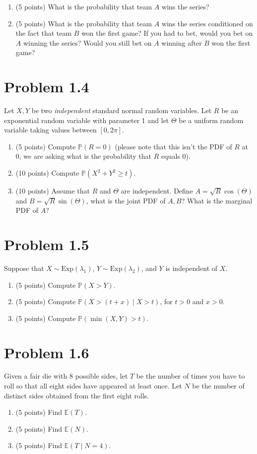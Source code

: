 \documentclass{article}
\begin{document}
\begin{enumerate}[label=(\alph*)]
    \item (5 points) What is the probability that team $A$ wins the series?
    \item (5 points) What is the probability that team $A$ wins the series conditioned on the fact that team $B$ won the first game? If you had to bet, would you bet on $A$ winning the series? Would you still bet on $A$ winning after $B$ won the first game?
\end{enumerate}

\section*{Problem 1.4}
Let $X, Y$ be two \textit{independent} standard normal random variables. Let $R$ be an exponential random variable with parameter 1 and let $\Theta$ be a uniform random variable taking values between $[0, 2\pi]$.

\begin{enumerate}[label=(\alph*)]
    \item (5 points) Compute $\mathbb{P}(R = 0)$ (please note that this isn’t the PDF of $R$ at 0, we are asking what is the probability that $R$ equals 0).
    \item (10 points) Compute $\mathbb{P}(X^2 + Y^2 \geq t)$.
    \item (10 points) Assume that $R$ and $\Theta$ are independent. Define $A = \sqrt{R}\cos(\Theta)$ and $B = \sqrt{R}\sin(\Theta)$, what is the joint PDF of $A, B$? What is the marginal PDF of $A$?
\end{enumerate}

\section*{Problem 1.5}
Suppose that $X \sim \text{Exp}(\lambda_1)$, $Y \sim \text{Exp}(\lambda_2)$, and $Y$ is independent of $X$.

\begin{enumerate}[label=(\alph*)]
    \item (5 points) Compute $\mathbb{P}(X > Y)$.
    \item (5 points) Compute $\mathbb{P}(X > (t + x) \mid X > t)$, for $t > 0$ and $x > 0$.
    \item (5 points) Compute $\mathbb{P}(\min(X, Y) > t)$.
\end{enumerate}

\section*{Problem 1.6}
Given a fair die with 8 possible sides, let $T$ be the number of times you have to roll so that all eight sides have appeared at least once. Let $N$ be the number of distinct sides obtained from the first eight rolls.

\begin{enumerate}[label=(\alph*)]
    \item (5 points) Find $\mathbb{E}(T)$.
    \item (5 points) Find $\mathbb{E}(N)$.
    \item (5 points) Find $\mathbb{E}(T \mid N = 4)$.
\end{enumerate}
\end{document}
